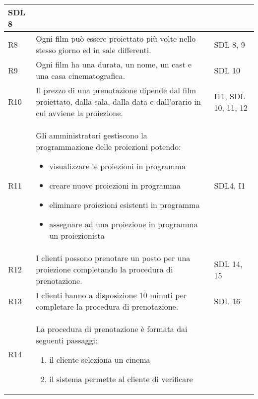 \begin{longtable}{|p{0.8cm}|p{13.4cm}|p{2.1cm}|}
      SDL 8
      \\\hline
      R8                                                                      &
      Ogni film può essere proiettato più volte nello stesso giorno ed
      in sale differenti.                                                     &
      SDL 8, 9
      \\\hline
      R9                                                                      &
      Ogni film ha una durata, un nome, un cast e una casa cinematografica.   &
      SDL 10
      \\\hline
      R10                                                                     &
      Il prezzo di una prenotazione dipende dal film proiettato, dalla
      sala, dalla data e dall'orario in cui avviene la proiezione.            &
      I11, SDL 10, 11, 12
      \\\hline
      R11                                                                     &
      Gli amministratori gestiscono la programmazione delle proiezioni
      potendo:
      \begin{itemize}
            \item visualizzare le proiezioni in programma
            \item creare nuove proiezioni in programma
            \item eliminare proiezioni esistenti in programma
            \item assegnare ad una proiezione in programma un proiezionista
      \end{itemize}         &
      SDL4, I1
      \\\hline
      R12                                                                     &
      I clienti possono prenotare un posto per una proiezione completando
      la procedura di prenotazione.                                           &
      SDL 14, 15
      \\\hline
      R13                                                                     &
      I clienti hanno a disposizione 10 minuti per completare la procedura
      di prenotazione.                                                        &
      SDL 16
      \\\hline
      R14                                                                     &
      La procedura di prenotazione è formata dai seguenti passaggi:
      \begin{enumerate}
            \item il cliente seleziona un cinema
            \item il sistema permette al cliente di verificare

\end{enumerate}
\end{longtable}
